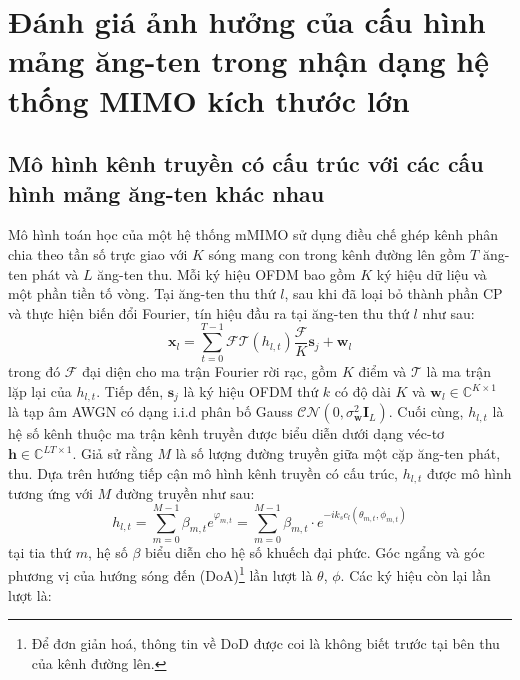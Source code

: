 \clearpage
{}

\setcounter{chapter}{1}
\chapter[{ĐÁNH GIÁ ẢNH HƯỞNG CỦA CẤU HÌNH MẢNG ĂNG-TEN TRONG NHẬN DẠNG HỆ THỐNG MIMO KÍCH THƯỚC LỚN}]{Đánh giá ảnh hưởng của cấu hình mảng ăng-ten trong nhận dạng hệ thống MIMO kích thước lớn}
\label{sec:CRB}

\section{Mô hình kênh truyền có cấu trúc với các cấu hình mảng ăng-ten khác nhau}\label{SM}

Mô hình toán học của một hệ thống mMIMO sử dụng điều chế ghép kênh phân chia theo tần số trực giao với $K$ sóng mang con trong kênh đường lên gồm $T$ ăng-ten phát và $L$ ăng-ten thu. Mỗi ký hiệu OFDM bao gồm $K$ ký hiệu dữ liệu và một phần tiền tố vòng. Tại ăng-ten thu thứ $l$, sau khi đã loại bỏ thành phần CP và thực hiện biến đổi Fourier, tín hiệu đầu ra tại ăng-ten thu thứ $l$ như sau:
\begin{equation}
    \mathbf{x}_{l}=\sum_{t=0}^{T-1} \mathcal{F} \mathcal{T}\left(h_{l, t}\right) \frac{\mathcal{F}}{K} \mathbf{s}_{j}+\mathbf{w}_{l}
\end{equation}
trong đó $\mathcal{F}$ đại diện cho ma trận Fourier rời rạc, gồm $K$ điểm và $\mathcal{T}$ là ma trận lặp lại của $h_{l, t}$. Tiếp đến, $\mathbf{s}_{j}$ là ký hiệu OFDM thứ $k$ có độ dài $K$ và $\mathbf{w}_{l} \in \mathbb{C}^{K \times 1}$ là tạp âm AWGN có dạng i.i.d phân bố Gauss $\mathcal{C} \mathcal{N}\left({0}, \sigma_{\mathbf{w}}^{2} \mathbf{I}_L\right)$. 
Cuối cùng, $h_{l, t}$ là hệ số kênh thuộc ma trận kênh truyền được biểu diễn dưới dạng véc-tơ $\mathbf{h} \in \mathbb{C}^{L T \times 1}$.
Giả sử rằng $M$ là số lượng đường truyền giữa một cặp ăng-ten phát, thu. Dựa trên hướng tiếp cận mô hình kênh truyền có cấu trúc, $h_{l, t}$ được mô hình tương ứng với $M$ đường truyền như sau:
\begin{equation}
\label{eq:2}
        h_{l, t} = \sum\limits_{m=0}^{M-1} \beta_{m, t} e^{\varphi_{m, t}} = \sum\limits_{m=0}^{M-1} \beta_{m, t} \cdot e^{-i k_s c_l(\theta_{m, t}, \phi_{m, t})} 
\end{equation}
tại tia thứ $m$, hệ số $\beta$ biểu diễn cho hệ số khuếch đại phức. Góc ngẩng và góc phương vị của hướng sóng đến (DoA)\footnote{Để đơn giản hoá, thông tin về DoD được coi là không biết trước tại bên thu của kênh đường lên.} lần lượt là  $\theta$, $\phi$. Các ký hiệu còn lại lần lượt là:
